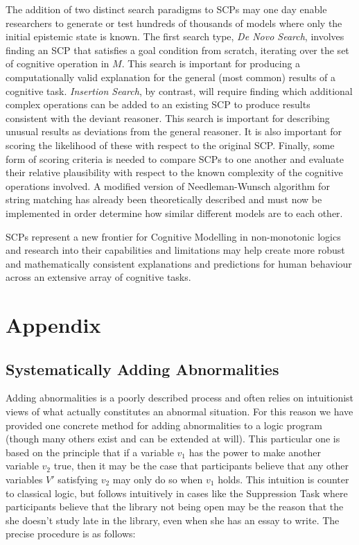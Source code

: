 \documentclass{article}
\begin{document}
The addition of two distinct search paradigms to SCPs may one day enable researchers to generate or test hundreds of thousands of models where only the initial epistemic state is known. The first search type, \textit{De Novo Search}, involves finding an SCP that satisfies a goal condition from scratch, iterating over the set of cognitive operation in $M$. This search is important for producing a computationally valid explanation for the general (most common) results of a cognitive task. \textit{Insertion Search}, by contrast, will require finding which additional complex operations can be added to an existing SCP to produce results consistent with the deviant reasoner. This search is important for describing unusual results as deviations from the general reasoner. It is also important for scoring the likelihood of these with respect to the original SCP. Finally, some form of scoring criteria is needed to compare SCPs to one another and evaluate their relative plausibility with respect to the known complexity of the cognitive operations involved. A modified version of Needleman-Wunsch algorithm for string matching has already been theoretically described and must now be implemented in order determine how similar different models are to each other.

SCPs represent a new frontier for Cognitive Modelling in non-monotonic logics and research into their capabilities and limitations may help create more robust and mathematically consistent explanations and predictions for human behaviour across an extensive array of cognitive tasks.


\newpage
	



\newpage
\section{Appendix}
\subsection{Systematically Adding Abnormalities} \label{ssec:addAbnormalities}
Adding abnormalities is a poorly described process and often relies on intuitionist views of what actually constitutes an abnormal situation. For this reason we have provided one concrete method for adding abnormalities to a logic program (though many others exist and can be extended at will). This particular one is based on the principle that if a variable $v_1$ has the power to make another variable $v_2$ true, then it may be the case that participants believe that any other variables $V'$ satisfying $v_2$ may only do so when $v_1$ holds. This intuition is counter to classical logic, but follows intuitively in cases like the Suppression Task where participants believe that the library not being open may be the reason that the she doesn't study late in the library, even when she has an essay to write. The precise procedure is as follows:
\end{document}
